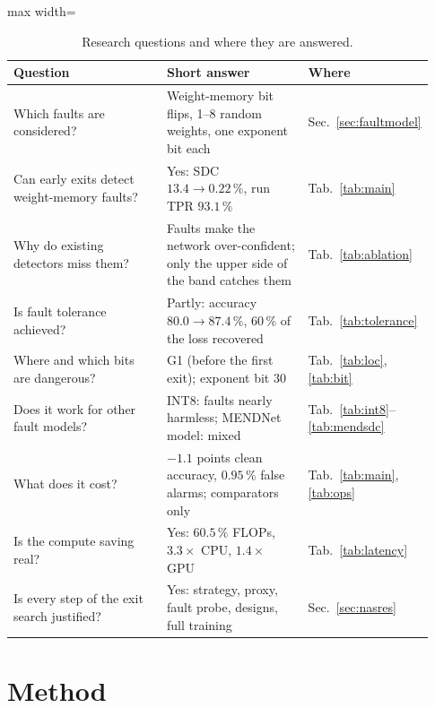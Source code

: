 \documentclass[10pt,a4paper]{article}
\begin{document}
\begin{table}[H]
\centering\small
\caption{Research questions and where they are answered.}
\label{tab:questions}
\begin{adjustbox}{max width=\linewidth}
\begin{tabular}{@{}p{0.40\linewidth}p{0.36\linewidth}p{0.17\linewidth}@{}}
\toprule
Question & Short answer & Where \\
\midrule
Which faults are considered?                           & Weight-memory bit flips, 1--8 random weights, one exponent bit each & Sec.~\ref{sec:faultmodel} \\
Can early exits detect weight-memory faults?           & Yes: SDC $13.4\to0.22\,\%$, run TPR $93.1\,\%$ & Tab.~\ref{tab:main} \\
Why do existing detectors miss them?                   & Faults make the network over-confident; only the upper side of the band catches them & Tab.~\ref{tab:ablation} \\
Is fault tolerance achieved?                           & Partly: accuracy $80.0\to87.4\,\%$, $60\,\%$ of the loss recovered & Tab.~\ref{tab:tolerance} \\
Where and which bits are dangerous?                    & G1 (before the first exit); exponent bit 30 & Tab.~\ref{tab:loc}, \ref{tab:bit} \\
Does it work for other fault models?                   & INT8: faults nearly harmless; MENDNet model: mixed & Tab.~\ref{tab:int8}--\ref{tab:mendsdc} \\
What does it cost?                                     & $-1.1$ points clean accuracy, $0.95\,\%$ false alarms; comparators only & Tab.~\ref{tab:main}, \ref{tab:ops} \\
Is the compute saving real?                            & Yes: $60.5\,\%$ FLOPs, $3.3\times$ CPU, $1.4\times$ GPU & Tab.~\ref{tab:latency} \\
Is every step of the exit search justified?            & Yes: strategy, proxy, fault probe, designs, full training & Sec.~\ref{sec:nasres} \\
\bottomrule
\end{tabular}
\end{adjustbox}
\end{table}

\section{Method}\label{sec:method}
\end{document}
